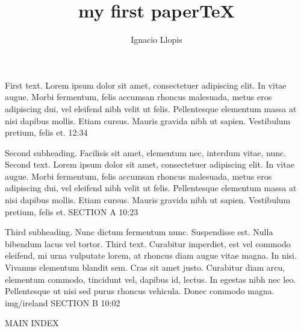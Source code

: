 \documentclass[10pt,final,hyphenatedtitles]{papertex}
\author{Ignacio Llopis}
\title{my first paperTeX}
\begin{document}

\begin{frontpage}

						{First text. Lorem ipsum dolor sit amet, consectetuer adipiscing elit. In vitae augue. Morbi 
fermentum, felis accumsan rhoncus malesuada, metus eros adipiscing dui, vel eleifend nibh velit ut felis. Pellentesque elementum massa at 
nisi dapibus mollis. Etiam cursus. Mauris gravida nibh ut sapien. Vestibulum pretium, felis et.}%
						{12:34}

%
						{Second subheading. Facilisis sit amet, elementum nec, interdum vitae, nunc.}%
						{Second text. Lorem ipsum dolor sit amet, consectetuer adipiscing elit. In vitae augue. 
Morbi fermentum, felis accumsan rhoncus malesuada, metus eros adipiscing dui, vel eleifend nibh velit ut felis. Pellentesque elementum massa 
at nisi dapibus mollis. Etiam cursus. Mauris gravida nibh ut sapien. Vestibulum pretium, felis et.}%
						{SECTION A}%
						{10:23}

%
					{Third subheading. Nunc dictum fermentum nunc. Suspendisse est. Nulla bibendum lacus vel tortor.}%
					{Third text. Curabitur imperdiet, est vel commodo eleifend, mi urna vulputate lorem, at rhoncus diam 
augue vitae magna. In nisi. Vivamus elementum blandit sem. Cras sit amet justo. Curabitur diam arcu, elementum commodo, tincidunt vel, 
dapibus id, lectus. In egestas nibh nec leo. Pellentesque ut nisi sed purus rhoncus vehicula. Donec commodo magna.}%
					{img/ireland}%
					{SECTION B}%
					{10:02}

\begin{indexblock}{MAIN INDEX}




\end{indexblock}
\end{frontpage}
\end{document}
